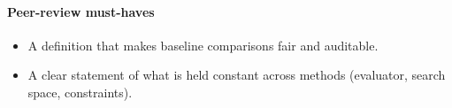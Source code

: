 \paragraph{Peer-review must-haves}
\begin{itemize}
  \item A definition that makes baseline comparisons fair and auditable.
  \item A clear statement of what is held constant across methods (evaluator, search space, constraints).
\end{itemize}
